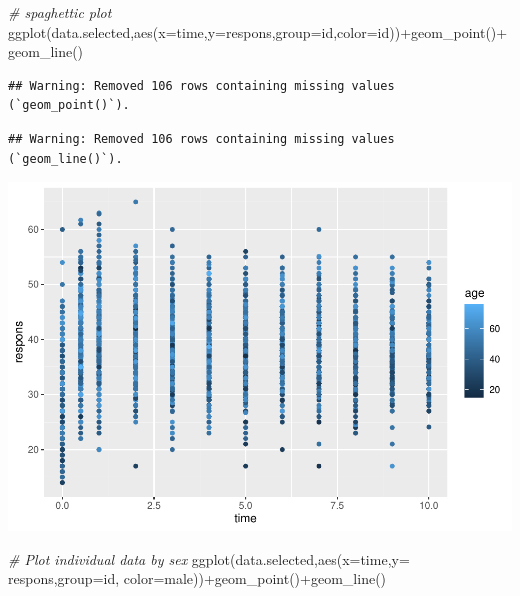 \documentclass[
]{article}
\newenvironment{Shaded}{\begin{snugshade}}{\end{snugshade}}
\newcommand{\AttributeTok}[1]{\textcolor[rgb]{0.77,0.63,0.00}{#1}}
\newcommand{\CommentTok}[1]{\textcolor[rgb]{0.56,0.35,0.01}{\textit{#1}}}
\newcommand{\FunctionTok}[1]{\textcolor[rgb]{0.00,0.00,0.00}{#1}}
\newcommand{\NormalTok}[1]{#1}
\newcommand{\SpecialCharTok}[1]{\textcolor[rgb]{0.00,0.00,0.00}{#1}}
\begin{document}
\begin{Shaded}
\begin{Highlighting}[]
\CommentTok{\# spaghettic plot}
\FunctionTok{ggplot}\NormalTok{(data.selected,}\FunctionTok{aes}\NormalTok{(}\AttributeTok{x=}\NormalTok{time,}\AttributeTok{y=}\NormalTok{respons,}\AttributeTok{group=}\NormalTok{id,}\AttributeTok{color=}\NormalTok{id))}\SpecialCharTok{+}\FunctionTok{geom\_point}\NormalTok{()}\SpecialCharTok{+} \FunctionTok{geom\_line}\NormalTok{()}
\end{Highlighting}
\end{Shaded}

\begin{verbatim}
## Warning: Removed 106 rows containing missing values (`geom_point()`).
\end{verbatim}

\begin{verbatim}
## Warning: Removed 106 rows containing missing values (`geom_line()`).
\end{verbatim}

\includegraphics{LDA_Wan_files/figure-latex/unnamed-chunk-11-1.pdf}

\begin{Shaded}
\begin{Highlighting}[]
\CommentTok{\# Plot individual data by sex}
\FunctionTok{ggplot}\NormalTok{(data.selected,}\FunctionTok{aes}\NormalTok{(}\AttributeTok{x=}\NormalTok{time,}\AttributeTok{y=}\NormalTok{ respons,}\AttributeTok{group=}\NormalTok{id, }\AttributeTok{color=}\NormalTok{male))}\SpecialCharTok{+}\FunctionTok{geom\_point}\NormalTok{()}\SpecialCharTok{+}\FunctionTok{geom\_line}\NormalTok{()}
\end{Highlighting}
\end{Shaded}
\end{document}
